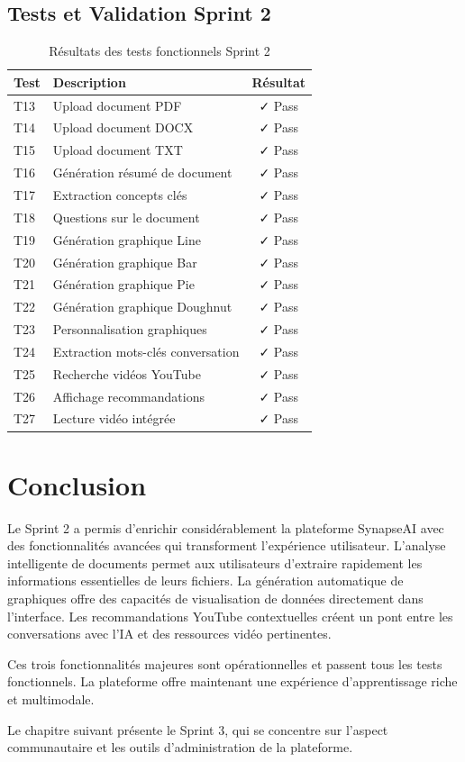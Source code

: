 \subsection{Tests et Validation Sprint 2}

\begin{table}[H]
\centering
\caption{Résultats des tests fonctionnels Sprint 2}
\label{tab:tests-sprint2}
\begin{tabular}{|l|p{6cm}|c|}
\hline
\textbf{Test} & \textbf{Description} & \textbf{Résultat} \\
\hline
T13 & Upload document PDF & ✓ Pass \\
\hline
T14 & Upload document DOCX & ✓ Pass \\
\hline
T15 & Upload document TXT & ✓ Pass \\
\hline
T16 & Génération résumé de document & ✓ Pass \\
\hline
T17 & Extraction concepts clés & ✓ Pass \\
\hline
T18 & Questions sur le document & ✓ Pass \\
\hline
T19 & Génération graphique Line & ✓ Pass \\
\hline
T20 & Génération graphique Bar & ✓ Pass \\
\hline
T21 & Génération graphique Pie & ✓ Pass \\
\hline
T22 & Génération graphique Doughnut & ✓ Pass \\
\hline
T23 & Personnalisation graphiques & ✓ Pass \\
\hline
T24 & Extraction mots-clés conversation & ✓ Pass \\
\hline
T25 & Recherche vidéos YouTube & ✓ Pass \\
\hline
T26 & Affichage recommandations & ✓ Pass \\
\hline
T27 & Lecture vidéo intégrée & ✓ Pass \\
\hline
\end{tabular}
\end{table}

\section{Conclusion}

Le Sprint 2 a permis d'enrichir considérablement la plateforme SynapseAI avec des fonctionnalités avancées qui transforment l'expérience utilisateur. L'analyse intelligente de documents permet aux utilisateurs d'extraire rapidement les informations essentielles de leurs fichiers. La génération automatique de graphiques offre des capacités de visualisation de données directement dans l'interface. Les recommandations YouTube contextuelles créent un pont entre les conversations avec l'IA et des ressources vidéo pertinentes.

Ces trois fonctionnalités majeures sont opérationnelles et passent tous les tests fonctionnels. La plateforme offre maintenant une expérience d'apprentissage riche et multimodale.

Le chapitre suivant présente le Sprint 3, qui se concentre sur l'aspect communautaire et les outils d'administration de la plateforme.

